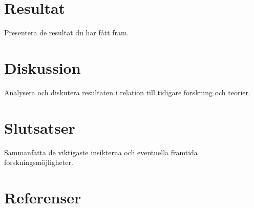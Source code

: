 \documentclass[a4paper,12pt,twocolumn]{article}
\begin{document}
\section{Resultat}
Presentera de resultat du har fått fram.

\section{Diskussion}
Analysera och diskutera resultaten i relation till tidigare forskning och teorier.

\section{Slutsatser}
Sammanfatta de viktigaste insikterna och eventuella framtida forskningsmöjligheter.

\section{Referenser}

\end{document}
